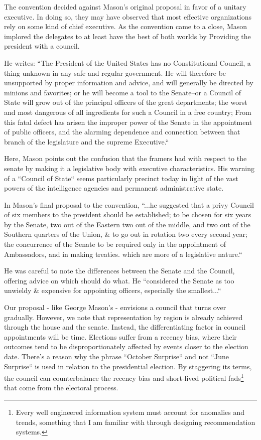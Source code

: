 \documentclass{article}
\begin{document}
The convention decided against Mason's original proposal in favor of a unitary executive. In doing so, they may have observed that most effective organizations rely on some kind of chief executive. As the convention came to a close, Mason implored the delegates to at least have the best of both worlds by Providing the president with a council.

He writes: “The President of the United States has no Constitutional Council, a thing unknown in any safe and regular government. He will therefore be unsupported by proper information and advice, and will generally be directed by minions and favorites; or he will become a tool to the Senate--or a Council of State will grow out of the principal officers of the great departments; the worst and most dangerous of all ingredients for such a Council in a free country; From this fatal defect has arisen the improper power of the Senate in the appointment of public officers, and the alarming dependence and connection between that branch of the legislature and the supreme Executive.“\cite{Mason_Objection}

Here, Mason points out the confusion that the framers had with respect to the senate by making it a legislative body with executive characteristics. His warning of a “Council of State“ seems particularly precinct today in light of the vast powers of the intelligence agencies and permanent administrative state.\cite{Cooper}

In Mason's final proposal to the convention, “...he suggested that a privy Council of six members to the president should be established; to be chosen for six years by the Senate, two out of the Eastern two out of the middle, and two out of the Southern quarters of the Union, \& to go out in rotation two every second year; the concurrence of the Senate to be required only in the appointment of Ambassadors, and in making treaties. which are more of a legislative nature.“\cite{Madison}

He was careful to note the differences between the Senate and the Council, offering advice on which should do what. He “considered the Senate as too unwieldy \& expensive for appointing officers, especially the smallest...“

Our proposal - like George Mason's - envisions a council that turns over gradually. However, we note that representation by region is already achieved through the house and the senate. Instead, the differentiating factor in council appointments will be time. Elections suffer from a recency bias, where their outcomes tend to be disproportionately affected by events closer to the election date. There's a reason why the phrase “October Surprise“ and not “June Surprise“ is used in relation to the presidential election. By staggering its terms, the council can counterbalance the recency bias and short-lived political fads\footnote{Every well engineered information system must account for anomalies and trends, something that I am familiar with through designing recommendation systems.\cite{Yang}} that come from the electoral process.
\end{document}

